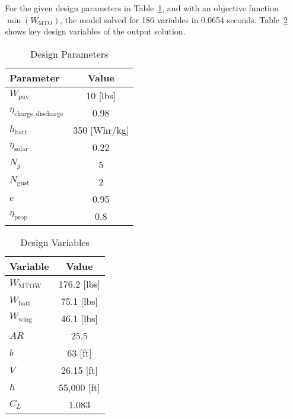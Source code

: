 \documentclass[]{aiaa-tc}%
\begin{document}
    For the given design parameters in Table~\ref{t:params}, and with an objective function $\min(W_{\mathrm{MTO}})$, the model solved for 186 variables in 0.0654 seconds.  Table~\ref{t:design} shows key design variables of the output solution. 

\begin{multicols}{2}

\begin{table}[H]
    \centering
    \caption{Design Parameters}
    \label{t:params}
    \begin{tabular}{l c}
    \toprule
    \toprule
    Parameter                                   & Value \\ \hline
    $W_{\mathrm{pay}}$                          & 10 [lbs] \\
    $\eta_{\mathrm{charge, discharge}}$         & 0.98\\
    $h_{\mathrm{batt}}$                         & 350 [Whr/kg]\\
    $\eta_{\mathrm{solar}}$                     & 0.22 \\
    $N_g$                                       & 5 \\
    $N_{\mathrm{gust}}$                         & 2 \\
    $e$                                         & 0.95 \\
    $\eta_{\mathrm{prop}}$                      & 0.8  \\
    \bottomrule
\end{tabular}
\end{table}
    
\begin{table}[H]
    \centering
    \caption{Design Variables}
    \label{t:design}
    \begin{tabular}{l c}
    \toprule
    \toprule
    Variable                    & Value         \\ \hline
    $W_{\mathrm{MTOW}}$         & 176.2 [lbs]   \\
    $W_{\mathrm{batt}}$         & 75.1 [lbs]    \\
    $W_{\mathrm{wing}}$         & 46.1 [lbs]    \\
    $AR$                        & 25.5          \\
    $b$                         & 63 [ft]       \\
    $V$                         & 26.15 [ft]    \\
    $h$                         & 55,000 [ft]   \\
    $C_L$                       & 1.083         \\
    \bottomrule
\end{tabular}
\end{table}

\end{multicols}
\end{document}
